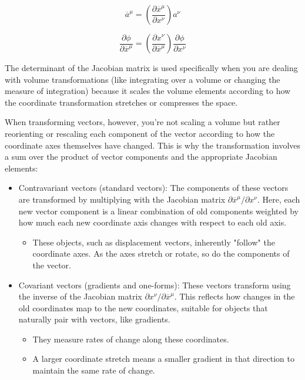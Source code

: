 $$
\overline{a}^{\mu} = \left( \frac{\partial \overline{x}^\mu}{\partial x^\nu} \right) a^\nu
$$

$$
\frac{\partial \phi}{\partial \overline{x}^\mu} =
    \left( \frac{\partial x^\nu}{\partial \overline{x}^\mu} \right) \frac{\partial \phi}{\partial x^\nu}
$$

The determinant of the Jacobian matrix is used specifically when you are dealing with volume transformations
(like integrating over a volume or changing the measure of integration) because it scales the volume elements according
to how the coordinate transformation stretches or compresses the space.

When transforming vectors, however, you're not scaling a volume but rather reorienting or rescaling each component
of the vector according to how the coordinate axes themselves have changed.
This is why the transformation involves a sum over the product of vector components and the appropriate Jacobian elements:

\begin{itemize}
\item Contravariant vectors (standard vectors): The components of these vectors are transformed by multiplying with the
    Jacobian matrix $\partial \overline{x}^\mu / \partial x^\nu$. Here, each new vector component is a linear combination
    of old components weighted by how much each new coordinate axis changes with respect to each old axis.
    \begin{itemize}
        \item These objects, such as displacement vectors, inherently "follow" the coordinate axes. As the axes stretch
        or rotate, so do the components of the vector. 
    \end{itemize}
\item Covariant vectors (gradients and one-forms): These vectors transform using the inverse of the Jacobian matrix
    $\partial x^\nu / \partial \overline{x}^\mu$. This reflects how changes in the old coordinates map to the new
    coordinates, suitable for objects that naturally pair with vectors, like gradients.
    \begin{itemize}
        \item They measure rates of change along these coordinates.
        \item A larger coordinate stretch means a smaller gradient in that direction to maintain the same rate of change.
    \end{itemize}
\end{itemize}




